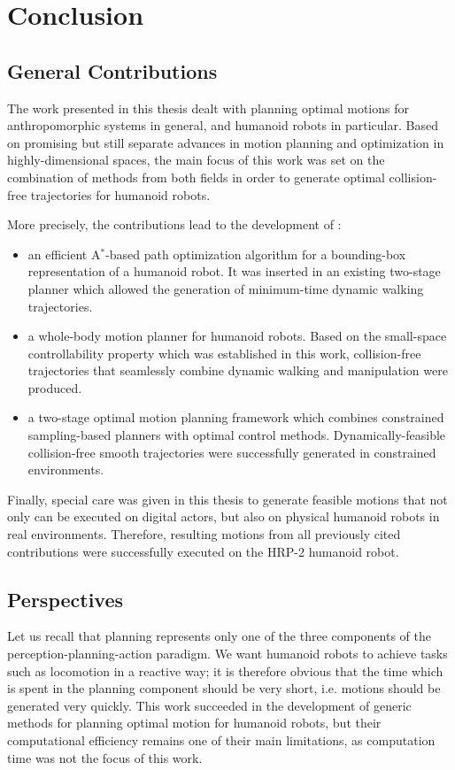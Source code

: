 \chapter{Conclusion}
\label{chap:conclusion}

\section{General Contributions}

The work presented in this thesis dealt with planning optimal motions
for anthropomorphic systems in general, and humanoid robots in
particular. Based on promising but still separate advances in
motion planning and optimization in highly-dimensional spaces, the
main focus of this work was set on the combination of methods from
both fields in order to generate optimal collision-free trajectories
for humanoid robots.

More precisely, the contributions lead to the development of :
\begin{itemize}
\item an efficient A$^*$-based path optimization algorithm for a
  bounding-box representation of a humanoid robot. It was inserted in
  an existing two-stage planner which allowed the generation of
  minimum-time dynamic walking trajectories.
\item a whole-body motion planner for humanoid robots. Based on the
  small-space controllability property which was established in this
  work, collision-free trajectories that seamlessly combine dynamic
  walking and manipulation were produced.
\item a two-stage optimal motion planning framework which combines
  constrained sampling-based planners with optimal control
  methods. Dynamically-feasible collision-free smooth trajectories
  were successfully generated in constrained environments.
\end{itemize}

Finally, special care was given in this thesis to generate feasible
motions that not only can be executed on digital actors, but also on
physical humanoid robots in real environments. Therefore, resulting
motions from all previously cited contributions were successfully
executed on the HRP-2 humanoid robot.

\section{Perspectives}

Let us recall that planning represents only one of the three
components of the perception-planning-action paradigm. We want
humanoid robots to achieve tasks such as locomotion in a reactive way;
it is therefore obvious that the time which is spent in the planning
component should be very short, i.e. motions should be generated very
quickly. This work succeeded in the development of generic methods for
planning optimal motion for humanoid robots, but their computational
efficiency remains one of their main limitations, as computation
time was not the focus of this work.

